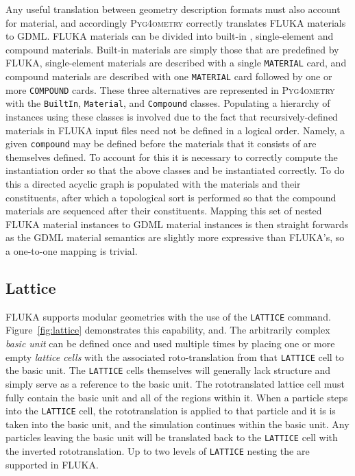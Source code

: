 \documentclass[final,5p,times,twocolumn]{elsarticle}
\newcommand{\pyinline}[1]{\lstinline[postbreak={}]{#1}}
\newcommand{\fluka}[1]{\texttt{\MakeUppercase{#1}}}
\newcommand{\PYGEOMETRY}{\textsc{Pyg4ometry}}
\begin{document}
Any useful translation between geometry description formats must also
account for material, and accordingly \PYGEOMETRY{} correctly translates
FLUKA materials to GDML.  FLUKA materials can be divided into built-in ,
single-element and compound materials.  Built-in materials are simply those
that are predefined by FLUKA, single-element materials are described with a
single \fluka{material} card, and compound materials are described with one
\fluka{material} card followed by one or more \fluka{compound} cards.
These three alternatives are represented in \PYGEOMETRY{} with the
\pyinline{BuiltIn}, \pyinline{Material}, and \pyinline{Compound} classes.
Populating a hierarchy of instances using these classes is involved due to
the fact that recursively-defined materials in FLUKA input files need not
be defined in a logical order.  Namely, a given \pyinline{compound} may be
defined before the materials that it consists of are themselves defined.
To account for this it is necessary to correctly compute the instantiation
order so that the above classes and be instantiated correctly.  To do this
a directed acyclic graph is populated with the materials and their
constituents, after which a topological sort is performed so that the
compound materials are sequenced after their constituents.  Mapping this
set of nested FLUKA material instances to GDML material instances is then
straight forwards as the GDML material semantics are slightly more
expressive than FLUKA's, so a one-to-one mapping is trivial.


\subsection{Lattice}

FLUKA supports modular geometries with the use of the \fluka{lattice}
command. Figure~\ref{fig:lattice} demonstrates this capability, and. The
arbitrarily complex \textit{basic unit} can be defined once and used
multiple times by placing one or more empty \textit{lattice cells} with the
associated roto-translation from that \fluka{lattice} cell to the basic
unit. The \fluka{lattice} cells themselves will generally lack structure
and simply serve as a reference to the basic unit. The rototranslated
lattice cell must fully contain the basic unit and all of the regions
within it. When a particle steps into the \fluka{lattice} cell, the
rototranslation is applied to that particle and it is is taken into the
basic unit, and the simulation continues within the basic unit. Any
particles leaving the basic unit will be translated back to the
\fluka{lattice} cell with the inverted rototranslation. Up to two
levels of \fluka{lattice} nesting the are supported in FLUKA.
\end{document}

